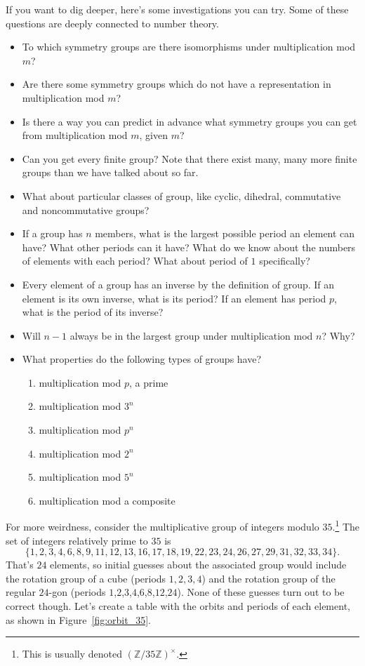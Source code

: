 \documentclass[../gatm.tex]{subfiles}
\begin{document}
\noindent If you want to dig deeper, here's some investigations you can try. Some of these questions are deeply connected to number theory.
\begin{itemize}
\item To which symmetry groups are there isomorphisms under multiplication mod $m$?
\item Are there some symmetry groups which do not have a representation in multiplication mod $m$?
\item Is there a way you can predict in advance what symmetry groups you can get from multiplication mod $m$, given $m$?
\item Can you get every finite group? Note that there exist many, many more finite groups than we have talked about so far.
\item What about particular classes of group, like cyclic, dihedral, commutative and noncommutative groups?
\item If a group has $n$ members, what is the largest possible period an element can have? What other periods can it have? What do we know about the numbers of elements with each period? What about period of $1$ specifically?
\item Every element of a group has an inverse by the definition of group. If an element is its own inverse, what is its period? If an element has period $p$, what is the period of its inverse?
\item Will $n-1$ always be in the largest group under multiplication mod $n$? Why?
\item What properties do the following types of groups have?
\begin{multicols}{2}
\begin{enumerate}
\item multiplication mod $p$, a prime
\item multiplication mod $3^n$
\item multiplication mod $p^n$
\item multiplication mod $2^n$
\item multiplication mod $5^n$
\item multiplication mod a composite
\end{enumerate}
\end{multicols}
\end{itemize}

\noindent For more weirdness, consider the multiplicative group of integers modulo $35$.\footnote{This is usually denoted $(\mathbb{Z}/35\mathbb{Z})^\times$.} The set of integers relatively prime to $35$ is $$\{1,2,3,4,6,8,9,11,12,13,16,17,18,19,22,23,24,26,27,29,31,32,33,34\}.$$ That's $24$ elements, so initial guesses about the associated group would include the rotation group of a cube (periods $1,2,3,4$) and the rotation group of the regular $24$-gon (periods $1$,$2$,$3$,$4$,$6$,$8$,$12$,$24$). None of these guesses turn out to be correct though. Let's create a table with the orbits and periods of each element, as shown in Figure~\ref{fig:orbit_35}.
\end{document}
